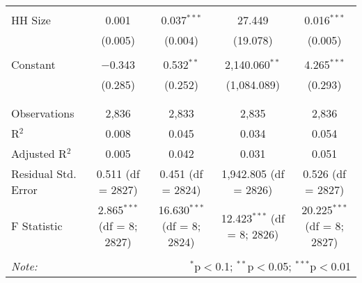\begin{table}[!htbp]
\begin{tabular}{@{\extracolsep{5pt}}lcccc}
  & & & & \\ 
 HH Size & 0.001 & 0.037$^{***}$ & 27.449 & 0.016$^{***}$ \\ 
  & (0.005) & (0.004) & (19.078) & (0.005) \\ 
  & & & & \\ 
 Constant & $-$0.343 & 0.532$^{**}$ & 2,140.060$^{**}$ & 4.265$^{***}$ \\ 
  & (0.285) & (0.252) & (1,084.089) & (0.293) \\ 
  & & & & \\ 
\hline \\[-1.8ex] 
Observations & 2,836 & 2,833 & 2,835 & 2,836 \\ 
R$^{2}$ & 0.008 & 0.045 & 0.034 & 0.054 \\ 
Adjusted R$^{2}$ & 0.005 & 0.042 & 0.031 & 0.051 \\ 
Residual Std. Error & 0.511 (df = 2827) & 0.451 (df = 2824) & 1,942.805 (df = 2826) & 0.526 (df = 2827) \\ 
F Statistic & 2.865$^{***}$ (df = 8; 2827) & 16.630$^{***}$ (df = 8; 2824) & 12.423$^{***}$ (df = 8; 2826) & 20.225$^{***}$ (df = 8; 2827) \\ 
\hline 
\hline \\[-1.8ex] 
\textit{Note:}  & \multicolumn{4}{r}{$^{*}$p$<$0.1; $^{**}$p$<$0.05; $^{***}$p$<$0.01} \\ 
\end{tabular} 
\end{table} 
